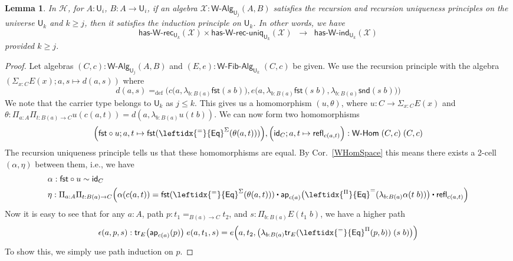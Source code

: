 \documentclass[reqno,10pt,a4paper,oneside]{amsart}
\newcommand{\X}{\mathcal{X}}
\newcommand{\fst}{\mathsf{fst}}
\newcommand{\snd}{\mathsf{snd}}
\newcommand{\comp}{\circ}
\newcommand{\idfun}[1]{\mathsf{id}_{#1}}
\newcommand{\prd}[1]{\Pi_{#1}}
\newcommand{\sm}[1]{\Sigma_{#1}}
\newcommand{\lam}[1]{\lambda_{#1}}
\newcommand{\defeq}{=_{\mathrm{def}}}
\newcommand{\refl}{\mathsf{refl}}
\newcommand{\funext}{\leftidx{^\Pi}{\mathsf{Eq}}^{=}}
\newcommand{\happly}{\leftidx{^=}{\mathsf{Eq}}^{\Pi}}
\newcommand{\idtodpair}{\leftidx{^=}{\mathsf{Eq}}^{\Sigma}}
\newcommand{\UU}{\mathsf{U}}
\newcommand{\WAlg}{\mathsf{W}\text{-}\mathsf{Alg}}
\newcommand{\WFibAlg}{\mathsf{W}\text{-}\mathsf{Fib}\text{-}\mathsf{Alg}}
\newcommand{\WHom}{\mathsf{W}\text{-}\mathsf{Hom}}
\newcommand{\HasWRec}{\mathsf{has}\text{-}\mathsf{W}\text{-}\mathsf{rec}}
\newcommand{\HasWInd}{\mathsf{has}\text{-}\mathsf{W}\text{-}\mathsf{ind}}
\newcommand{\HasWRecUniq}{\mathsf{has}\text{-}\mathsf{W}\text{-}\mathsf{rec}\text{-}\mathsf{uniq}}
\newcommand{\app}{\mathsf{ap}}
\newcommand{\trans}{\mathsf{tr}}
\newcommand{\Hint}{\mathcal{H}}
\newcommand{\ct}{%
  \mathchoice{\mathbin{\raisebox{0.5ex}{$\displaystyle\centerdot$}}}%
             {\mathbin{\raisebox{0.5ex}{$\centerdot$}}}%
             {\mathbin{\raisebox{0.25ex}{$\scriptstyle\,\centerdot\,$}}}%
             {\mathbin{\raisebox{0.1ex}{$\scriptscriptstyle\,\centerdot\,$}}}}
\numberwithin{equation}{section}
\theoremstyle{mythm}
\newtheorem{lemma}[theorem]{Lemma}
\theoremstyle{mydef}
\theoremstyle{myrmk}
\begin{document}
\begin{lemma}\label{lem:WRecUniqImpIndInt}
In $\Hint$, for $A:\UU_i$, $B : A \to \UU_i$, if an algebra $\X : \WAlg_{\UU_j}(A,B)$ satisfies the recursion and recursion uniqueness principles on the universe $\UU_k$ and $k \geq j$, then it satisfies the induction principle on $\UU_k$. In other words, we have
\[ \HasWRec_{\UU_k}(\X) \times \HasWRecUniq_{\UU_k}(\X) \;\; \rightarrow \; \; \HasWInd_{\UU_k}(\X) \]
provided $k \geq j$.
\end{lemma}
\begin{proof}
Let algebras $(C,c) : \WAlg_{\UU_j}(A,B)$ and $(E,e) : \WFibAlg_{\UU_k} \; (C,c)$ be given. We use the recursion principle with the algebra $(\sm{x:C} E(x); a,s \mapsto d(a,s))$ where
\[ d(a,s) \defeq \Big(c\big(a,\lam{b:B(a)} \fst(s\;b)\big), e\big(a, \lam{b:B(a)} \fst(s\;b), \lam{b:B(a)} \snd(s\;b)\big) \Big) \]
We note that the carrier type belongs to $\UU_k$ as $j \leq k$. This gives us a homomorphism $(u,\theta)$, where $u : C \to \sm{x:C} E(x)$ and $\theta : \prd{a:A}\prd{t:B(a)\to C} u(c(a,t)) = d(a,\lam{b:B(a)}u(t\;b))$. We can now form two homomorphisms 
\[\Big(\fst \comp u; a,t \mapsto \fst(\idtodpair(\theta(a,t)))\Big), \Big(\idfun{C}; a,t \mapsto \refl_{c(a,t)}\Big) : \WHom \; (C,c) \; (C,c)\]
The recursion uniqueness principle tells us that these homomorphisms are equal. By Cor.~\ref{WHomSpace} this means there exists a 2-cell $(\alpha,\eta)$ between them, i.e., we have 
\begin{align*}
& \alpha : \fst \comp u \sim \idfun{C} \\
& \eta : \prd{a:A}\prd{t:B(a)\to C} \Big(\alpha(c(a,t)) = \fst(\idtodpair(\theta(a,t))) \ct \app_{c(a)}\big(\funext(\lam{b:B(a)} \alpha(t\;b))\big) \ct \refl_{c(a,t)}\Big)
\end{align*}
Now it is easy to see that for any $a : A$, path $p : t_1 =_{B(a) \to C} t_2$, and $s : \prd{b:B(a)} E(t_1 \; b)$, we have a higher path
\[ \epsilon(a,p,s) : \trans_E\big(\app_{c(a)}(p)\big) \; e(a,t_1,s) = e\Big(a,t_2,\big(\lam{b:B(a)} \trans_E(\happly(p,b)) \; (s \; b)\big)\Big) \] 
To show this, we simply use path induction on $p$.


\end{proof}
\end{document}
